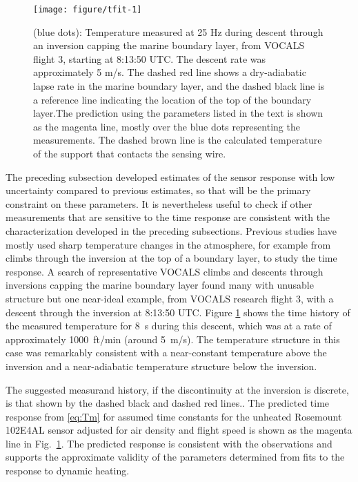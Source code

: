 \documentclass[11pt,twoside,american,12pt,twoside,american]{article}\usepackage[]{graphicx}\usepackage[]{color}
\makeatletter
\def\maxwidth{ %
  \ifdim\Gin@nat@width>\linewidth
    \linewidth
  \else
    \Gin@nat@width
  \fi
}
\newenvironment{knitrout}{}{} %
\makeatother
\begin{document}
\begin{knitrout}
\color{fgcolor}\begin{figure}[t]

{\centering \texttt{[image: figure/tfit-1]} 

}

\caption[(blue dots)]{(blue dots): Temperature measured at 25 Hz during descent through an inversion capping the marine boundary layer, from VOCALS flight 3, starting at 8:13:50 UTC. The descent rate was approximately 5 m/s. The dashed red line shows a dry-adiabatic lapse rate in the marine boundary layer, and the dashed black line is a reference line indicating the location of the top of the boundary layer.The  prediction using the parameters listed in the text is shown as the magenta line, mostly over the blue dots representing the measurements. The dashed brown line is the calculated temperature of the support that contacts the sensing wire.}\label{fig:tfit}
\end{figure}


\end{knitrout}

The preceding subsection developed estimates of the sensor response
with low uncertainty compared to previous estimates, so that will
be the primary constraint on these parameters. It is nevertheless
useful to check if other measurements that are sensitive to the time
response are consistent with the characterization developed in the
preceding subsections. Previous studies have mostly used sharp temperature
changes in the atmosphere, for example from climbs through the inversion
at the top of a boundary layer, to study the time response. A search
of representative VOCALS climbs and descents through inversions capping
the marine boundary layer found many with unusable structure but one
near-ideal example, from VOCALS research flight 3, with a descent
through the inversion at 8:13:50 UTC. Figure \ref{fig:tfit} shows
the time history of the measured temperature for 8~s during this
descent, which was at a rate of approximately 1000~ft/min (around
5~m/s). The temperature structure in this case was remarkably consistent
with a near-constant temperature above the inversion and a near-adiabatic
temperature structure below the inversion.

The suggested measurand history, if the discontinuity at the inversion
is discrete, is that shown by the dashed black and dashed red lines..
The predicted time response from \eqref{eq:Tm} for assumed time constants
for the unheated Rosemount 102E4AL sensor adjusted for air density
and flight speed is shown as the magenta line in Fig.~\ref{fig:tfit}.
The predicted response is consistent with the observations and supports
the approximate validity of the parameters determined from fits to
the response to dynamic heating.
\end{document}
